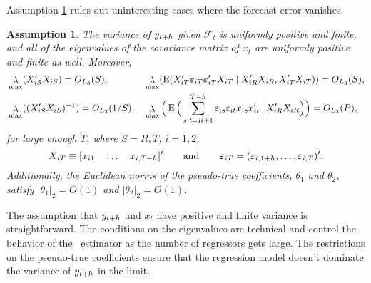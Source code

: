 \documentclass[11pt]{article}
\newcommand{\e}{\varepsilon}
\DeclareMathOperator{\eigen}{\lambda}
\newtheorem{asmp}{Assumption}
\begin{document}
Assumption \ref{asmp-2} rules out uninteresting cases where the
forecast error vanishes.
\begin{asmp}\label{asmp-2}
  The variance of $y_{t+h}$ given $\mathcal{F}_t$ is uniformly
  positive and finite, and all of the eigenvalues of the covariance
  matrix of $x_t$ are uniformly positive and finite as well.
  Moreover,
  \begin{align*}
    &\eigen_{\max}(X_{iS}'X_{iS}) = O_{L_3}(S),&
    &\eigen_{\max}(\E(X_{iT}'\ep{iT}\ep{iT}'X_{iT}
    \mid X_{iR}'X_{iR}, X_{iT}'X_{iT})) = O_{L_3}(S),\\
    &\eigen_{\max}((X_{iS}'X_{iS})^{-1}) = O_{L_3}(1/S),&
    &\eigen_{\max}\Big(\E\Big( \sum_{s,t=R+1}^{T-h} \e_{is} \e_{it} x_{is}x_{it}'
    \,\Big|\, X_{iR}'X_{iR} \Big)\Big) = O_{L_3}(P),
  \end{align*}
  for large enough $T$, where $S = R,T$, $i = 1,2$,
  \[ X_{iT} \equiv [x_{i1} \quad \dots \quad x_{i,T-\h}]' \qquad
  \text{and} \qquad \ep{iT} = (\e_{i,1+\h}, \dots, \e_{i,T})'.\]
  Additionally, the Euclidean norms of the pseudo-true coefficients,
  $\theta_1$ and $\theta_2$, satisfy $|\theta_1|_2 = O(1)$ and
  $|\theta_2|_2 = O(1)$.
\end{asmp}

The assumption that $y_{t+h}$ and $x_t$ have positive and finite
variance is straightforward.  The conditions on the eigenvalues are
technical and control the behavior of the \ols\ estimator as the
number of regressors gets large.  The restrictions on the pseudo-true
coefficients ensure that the regression model doesn't dominate the
variance of $y_{t+h}$ in the limit.
\end{document}
